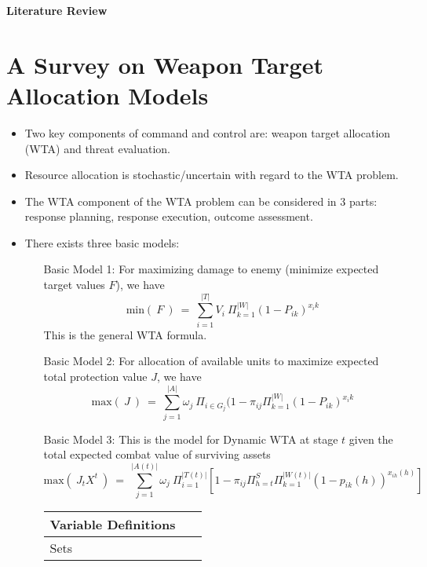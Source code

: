 \documentclass[12pt]{article} %
\begin{document}
 

\begin{center}
\textbf{Literature Review}
\end{center}
\bigskip


\section*{A Survey on Weapon Target Allocation Models \\ \cite{Ghanbari2021ASO}}
\begin{itemize}
\item Two key components of command and control are: weapon target allocation (WTA) and threat evaluation.
\item Resource allocation is stochastic/uncertain with regard to the WTA problem.
\item The WTA component of the WTA problem can be considered in 3 parts: response planning, response execution, outcome assessment.
\item There exists three basic models:
\begin{center}
\begin{enumerate}
    \item[Basic Model 1:] For maximizing damage to enemy (minimize expected target values $F$), we have \[\text{min}(\ F\ )\ =\ \sum_{i=1}^{|T|}V_i\ \Pi_{k=1}^{|W|}(1 - P_{ik})^{x_ik}\]
    This is the general WTA formula.
    \item[Basic Model 2:] For allocation of available units to maximize expected total protection value $J$, we have \[\text{max}(\ J\ )\ =\ \sum_{j=1}^{|A|}\omega_j\ \Pi_{i \in G_j}(1 - \pi_{ij}\Pi_{k=1}^{|W|}(1 - P_{ik})^{x_ik}\]
    \item[Basic Model 3:] This is the model for Dynamic WTA at stage $t$ given the total expected combat value of surviving assets \[\text{max}(\ J_tX^t\ )\ =\ \sum_{j=1}^{|A(t)|}\omega_j\ \Pi_{i=1}^{|T(t)|}\left[1 - \pi_{ij}\Pi_{h=t}^S\Pi_{k=1}^{|W(t)|}(1-p_{ik}(h))^{x_{ih}(h)}\right]\]
    \item[]
    \begin{center}
    \begin{tabular}{|p{4.25cm}  p{8cm}|}
    		\hline
    		\textbf{Variable Definitions} & \ \\
            \hline
            Sets & \\

\end{tabular}
\end{center}
\end{enumerate}
\end{center}
\end{itemize}
\end{document}
